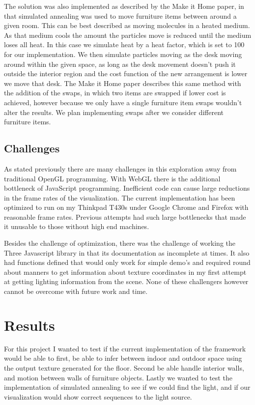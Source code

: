 \documentclass[twoside]{article}
\begin{document}
\begin{multicols}{2}
The solution was also implemented as described by the Make it Home paper, in that simulated annealing was used to move furniture
items between around a given room. This can be best described as moving molecules in a heated medium. As that medium cools the
amount the particles move is reduced until the medium loses all heat. In this case we simulate heat by a heat factor, which is
set to 100 for our implementation. We then simulate particles moving as the desk moving around within the given space, as long
as the desk movement doesn't push it outside the interior region and the cost function of the new arrangement is lower we move that
desk. The Make it Home paper describes this same method with the addition of the swaps, in which two items are swapped if lower
cost is achieved, however because we only have a single furniture item swaps wouldn't alter the results. We plan implementing swaps
after we consider different furniture items.

\subsection {Challenges}
As stated previously there are many challenges in this exploration away from traditional OpenGL programming. With WebGL there
is the additional bottleneck of JavaScript programming. Inefficient code can cause large reductions in the frame rates of the
visualization. The current implementation has been optimized to run on my Thinkpad T430s under Google Chrome and Firefox with
reasonable frame rates. Previous attempts had such large bottlenecks that made it unusable to those without high end machines.

Besides the challenge of optimization, there was the challenge of working the Three Javascript library in that its documentation
as incomplete at times. It also had functions defined that would only work for simple demo's and required round about manners
to get information about texture coordinates in my first attempt at getting lighting information from the scene. None of these
challengers however cannot be overcome with future work and time.
\section{Results}
For this project I wanted to test if the current implementation of the framework would be able to first, be able to infer
between indoor and outdoor space using the output texture generated for the floor. Second be able handle interior walls,
and motion between walls of furniture objects. Lastly we wanted to test the implementation of simulated annealing to see if
we could find the light, and if our visualization would show correct sequences to the light source. 


\end{multicols}
\end{document}
